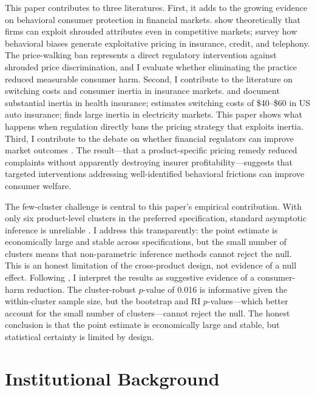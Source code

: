 \documentclass[12pt]{article}
\begin{document}
This paper contributes to three literatures. First, it adds to the growing evidence on behavioral consumer protection in financial markets. \citet{gabaix2006shrouded} show theoretically that firms can exploit shrouded attributes even in competitive markets; \citet{heidhues2017behavioral} survey how behavioral biases generate exploitative pricing in insurance, credit, and telephony. The price-walking ban represents a direct regulatory intervention against shrouded price discrimination, and I evaluate whether eliminating the practice reduced measurable consumer harm. Second, I contribute to the literature on switching costs and consumer inertia in insurance markets. \citet{handel2013adverse} and \citet{ericson2014market} document substantial inertia in health insurance; \citet{honka2014quantifying} estimates switching costs of \$40--\$60 in US auto insurance; \citet{hortacsu2017power} finds large inertia in electricity markets. This paper shows what happens when regulation directly bans the pricing strategy that exploits inertia. Third, I contribute to the debate on whether financial regulators can improve market outcomes \citep{shleifer2012can, campbell2011consumer}. The result---that a product-specific pricing remedy reduced complaints without apparently destroying insurer profitability---suggests that targeted interventions addressing well-identified behavioral frictions can improve consumer welfare.

The few-cluster challenge is central to this paper's empirical contribution. With only six product-level clusters in the preferred specification, standard asymptotic inference is unreliable \citep{cameron2008bootstrap, mackinnon2022wild}. I address this transparently: the point estimate is economically large and stable across specifications, but the small number of clusters means that non-parametric inference methods cannot reject the null. This is an honest limitation of the cross-product design, not evidence of a null effect. Following \citet{conley2011inference}, I interpret the results as suggestive evidence of a consumer-harm reduction. The cluster-robust $p$-value of 0.016 is informative given the within-cluster sample size, but the bootstrap and RI $p$-values---which better account for the small number of clusters---cannot reject the null. The honest conclusion is that the point estimate is economically large and stable, but statistical certainty is limited by design.


\section{Institutional Background}
\end{document}
